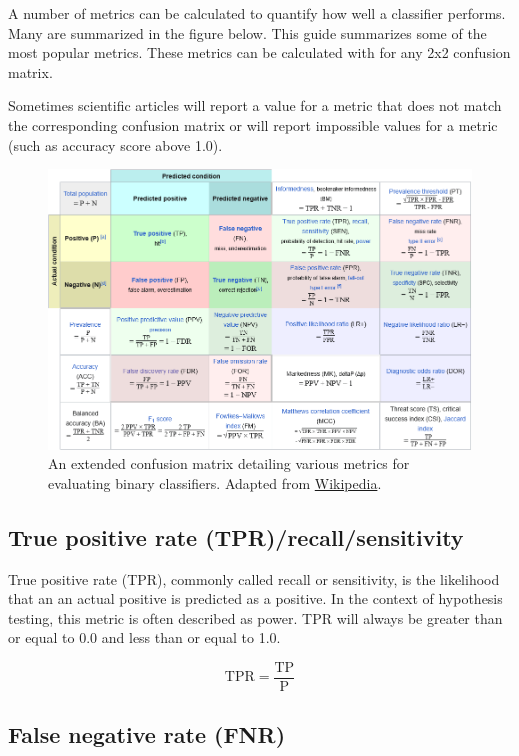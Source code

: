 \documentclass[letterpaper, 12pt]{article}
\begin{document}
A number of metrics can be calculated to quantify how well a classifier performs. Many are summarized in the figure below. This guide summarizes some of the most popular metrics. These metrics can be calculated with for any 2x2 confusion matrix. 

Sometimes scientific articles will report a value for a metric that does not match the corresponding confusion matrix or will report impossible values for a metric (such as accuracy score above 1.0).

\begin{figure}[h!tbp]
    \centering
    \includegraphics[width=\textwidth]{img/binary_classifiers/extended_confusion_matrix.png}
    \caption*{An extended confusion matrix detailing various metrics for evaluating binary classifiers. Adapted from \href{https://en.wikipedia.org/wiki/Evaluation_of_binary_classifiers}{Wikipedia}.}
\end{figure}

\pagebreak

\subsection*{True positive rate (TPR)/recall/sensitivity}

True positive rate (TPR), commonly called recall or sensitivity, is the likelihood that an an actual positive is predicted as a positive. In the context of hypothesis testing, this metric is often described as power. TPR will always be greater than or equal to 0.0 and less than or equal to 1.0.

$$\textrm{TPR} = \frac{\textrm{TP}}{\textrm{P}}$$

\subsection*{False negative rate (FNR)}
\end{document}
